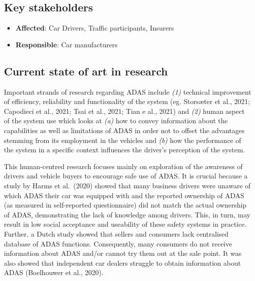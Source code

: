 \documentclass[
]{book}
\providecommand{\tightlist}{%
  \setlength{\itemsep}{0pt}\setlength{\parskip}{0pt}}
\begin{document}
\hypertarget{key-stakeholders-23}{%
\subsection*{Key stakeholders}\label{key-stakeholders-23}}

\begin{itemize}
\tightlist
\item
  \textbf{Affected}: Car Drivers, Traffic participants, Insurers
\item
  \textbf{Responsible}: Car manufacturers
\end{itemize}

\hypertarget{current-state-of-art-in-research-23}{%
\subsection*{Current state of art in research}\label{current-state-of-art-in-research-23}}

Important strands of research regarding ADAS include \emph{(1)} technical improvement of efficiency, reliability and functionality of the system (eg. Storsæter et al., 2021; Capodieci et al., 2021; Tsai et al., 2021; Tian e al., 2021) and \emph{(2)} human aspect of the system use which looks at \emph{(a)} how to convey information about the capabilities as well as limitations of ADAS in order not to offset the advantages stemming from its employment in the vehicles and \emph{(b)} how the performance of the system in a specific context influences the driver's perception of the system.

This human-centred research focuses mainly on exploration of the awareness of drivers and vehicle buyers to encourage safe use of ADAS. It is crucial because a study by Harms et al.~(2020) showed that many business drivers were unaware of which ADAS their car was equipped with and the reported ownership of ADAS (as measured in self-reported questionnaire) did not match the actual ownership of ADAS, demonstrating the lack of knowledge among drivers. This, in turn, may result in low social acceptance and useability of these safety systems in practice. Further, a Dutch study showed that sellers and consumers lack centralised database of ADAS functions. Consequently, many consumers do not receive information about ADAS and/or cannot try them out at the sale point. It was also showed that independent car dealers struggle to obtain information about ADAS (Boelhouwer et al., 2020).
\end{document}
